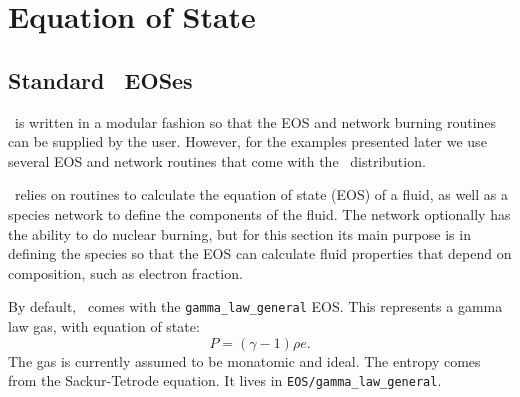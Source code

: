 \section{Equation of State}

\subsection{Standard \castro\ EOSes}

\castro\ is written in a modular fashion so that the EOS and network
burning routines can be supplied by the user. However, for the
examples presented later we use several EOS and network routines
that come with the \castro\ distribution.  

\castro\ relies on routines to calculate the equation of state (EOS) 
of a fluid, as well as a species network to define the components of 
the fluid. The network optionally has the ability to do nuclear burning, 
but for this section its main purpose is in defining the species so that 
the EOS can calculate fluid properties that depend on composition, such 
as electron fraction.

By default, \castro\ comes with the {\tt gamma\_law\_general}
EOS. This represents a gamma law gas, with equation of state:
\begin{equation}
  P = (\gamma - 1) \rho e.
\end{equation}
The gas is currently assumed to be monatomic and ideal. The entropy comes from the Sackur-Tetrode equation. 
It lives in {\tt EOS/gamma\_law\_general}.


